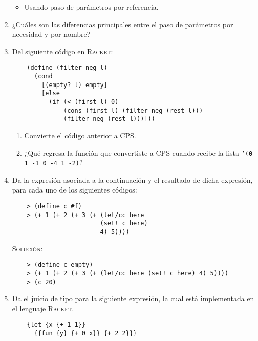 \documentclass[letterpaper,11pt]{article}
\begin{document}
\begin{enumerate}
\begin{itemize}
        \item Usando paso de parámetros por referencia.
    \end{itemize}

    \item ¿Cuáles son las diferencias principales entre el paso de parámetros
    por necesidad y por nombre?

    \item Del siguiente código en \textsc{Racket}:
    \begin{verbatim}
    (define (filter-neg l)
      (cond
        [(empty? l) empty]
        [else 
          (if (< (first l) 0)
              (cons (first l) (filter-neg (rest l)))
              (filter-neg (rest l)))]))
    \end{verbatim}

    \begin{enumerate}
        \item Convierte el código anterior a CPS.
        \item ¿Qué regresa la función que convertiste a CPS cuando recibe la 
        lista \texttt{'(0 1 -1 0 -4 1 -2)}?
    \end{enumerate}

    \item Da la expresión asociada a la continuación y el resultado de dicha 
    expresión, para cada uno de los siguientes códigos:
    \begin{verbatim}
    > (define c #f)
    > (+ 1 (+ 2 (+ 3 (+ (let/cc here 
                        (set! c here)
                        4) 5))))
    \end{verbatim}

    \textsc{Solución:}

    \begin{verbatim}
    > (define c empty)
    > (+ 1 (+ 2 (+ 3 (+ (let/cc here (set! c here) 4) 5))))
    > (c 20)
    \end{verbatim}

    \item Da el juicio de tipo para la siguiente expresión, la cual está 
    implementada en el lenguaje \textsc{Racket}.
    \begin{verbatim}
    {let {x {+ 1 1}}
      {{fun {y} {+ 0 x}} {+ 2 2}}}
    \end{verbatim}


\end{enumerate}
\end{document}

